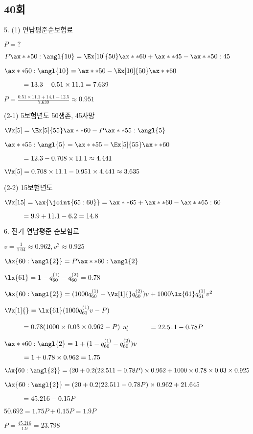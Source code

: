 \documentclass{article}
\newcommand\tab[1][1cm]{\hspace*{#1}}
\begin{document}
\begin{CJK}{UTF8}{mj}


\section*{40회}

5. (1) 연납평준순보험료

$ P = ? ~ $

$ P \ax**{50: \angl{10} } = \Ex[10]{50} \ax**{60} + \ax**{45} -  \ax**{50:45} $

$ \ax**{50: \angl{10}} = \ax**{50} - \Ex[10]{50} \ax**{60} $

$ \tab = 13.3 - 0.51 \times 11.1 = 7.639 $

$ P = \frac{0.51 \times 11.1 + 14.1 - 12.5}{7.639} \approx 0.951 $ 

(2-1) 5보험년도 50생존, 45사망

$ \Vx[5] = \Ex[5]{55} \ax**{60} - P \ax**{55: \angl{5}} $

$ \ax**{55: \angl{5}} = \ax**{55} - \Ex[5]{55} \ax**{60} $ 

$ \tab = 12.3 - 0.708 \times 11.1 \approx 4.441 $ 

$ \Vx[5] = 0.708 \times 11.1 - 0.951 \times 4.441 \approx 3.635 $

(2-2) 15보험년도 

$ \Vx[15] = \ax{\joint{65:60}} = \ax**{65} + \ax**{60} - \ax**{65:60} $ 

$ \tab = 9.9 + 11.1 - 6.2 = 14.8$


6. 전기 연납평준 순보험료

$ v = \frac{1}{1.04} \approx 0.962 , v^2 \approx 0.925 $

$ \Ax{60: \angl{2}} = P \ax**{60: \angl{2}} $

$ \lx{61} = 1 - q^{(1)}_{60} - q^{(2)}_{60} = 0.78 $

$ \Ax{60: \angl{2}} = ( 1000 q^{(1)}_{60} + \Vx[1]{} q^{(2)}_{60} ) v + 1000 \lx{61} q^{(1)}_{61} v^2  $

$ \Vx[1]{} = \lx{61} ( 1000 q^{(1)}_{61} v - P ) $ 

$ \tab = 0.78 (1000 \times 0.03 \times 0.962 - P) $
aj
$ \tab = 22.511 - 0.78 P $

$ \ax**{60: \angl{2}} = 1 + (1 - q^{(1)}_{60} - q^{(2)}_{60}) v $

$ \tab = 1 + 0.78 \times 0.962 = 1.75 $

$ \Ax{60: \angl{2}} = ( 20 + 0.2 (22.511 - 0.78 P ) \times 0.962 + 1000 \times 0.78 \times 0.03 \times 0.925 $

$ \Ax{60: \angl{2}} = ( 20 + 0.2 (22.511 - 0.78 P ) \times 0.962 + 21.645 $

$ \tab = 45.216 - 0.15 P $

$ 50.692 = 1.75 P + 0.15 P  = 1.9 P $

$ P = \frac{45.216}{1.9} = 23.798 $


\end{CJK}
\end{document}
